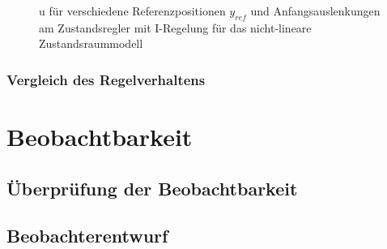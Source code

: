 \documentclass[
	pagesize,
	fontsize=12pt,
	paper=a4,
	oneside,
   reqno
]{scrartcl}
\begin{document}
\begin{figure}[H]
    \centering
    \caption[u für Regler mit I-Regelung (nicht-linear)]{u für verschiedene Referenzpositionen $y_{ref}$ und Anfangsauslenkungen am Zustandsregler mit I-Regelung für das nicht-lineare Zustandsraummodell}
    \label{fig:Bild29}
\end{figure}

\subsubsection{Vergleich des Regelverhaltens}

\clearpage

\section{Beobachtbarkeit}

\subsection{Überprüfung der Beobachtbarkeit}

\subsection{Beobachterentwurf}
\end{document}
